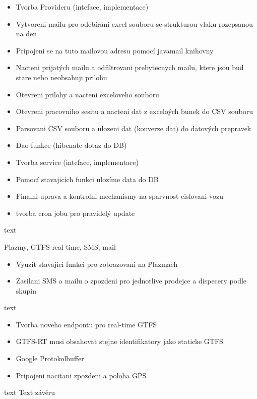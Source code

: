 \begin{itemize}
	\item Tvorba Provideru (inteface, implementace)
	\item Vytvoreni mailu pro odebírání excel souboru se strukturou vlaku rozepsanou na den
	\item Pripojeni se na tuto mailovou adresu pomocí javamail knihovny
	\item Nacteni prijatých mailu a odfiltrovani prebytecnych mailu, ktere jsou bud stare nebo neobsahuji prilohu
	\item Otevreni prilohy a nacteni exceloveho souboru
	\item Otevreni pracovniho sesitu a nacteni dat z exceloých bunek do CSV souboru
	\item Parsovani CSV souboru a ulozeni dat (konverze dat) do datových prepravek
	\item Dao funkce (hibenate dotaz do DB)
	\item Tvorba service (inteface, implementace)
	\item Pomocí stavajicích funkci ulozíme data do DB
	\item Finalni uprava a kontrolni mechanismy na sparvnost cislovani vozu
	\item tvorba cron jobu pro pravidelý update
\end{itemize}

text

Plazmy, GTFS-real time, SMS, mail

\begin{itemize}
	\item Vyuzit stavajici funkci pro zobrazovani na Plazmach
	\item Zasilani SMS a mailu o zpozdeni pro jednotlive prodejce a dispecery podle skupin
\end{itemize}

text

\begin{itemize}
	\item Tvorba noveho endpontu pro real-time GTFS
	\item GTFS-RT musi obsahovat stejne identifikatory jako staticke GTFS
	\item Google Protokolbuffer
	\item Pripojeni nacitani zpozdeni a poloha GPS
\end{itemize}

text
Text závěru


